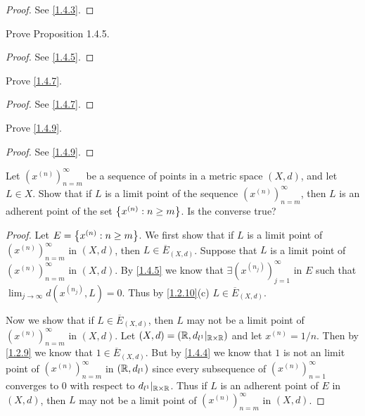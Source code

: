\begin{proof}
  See \cref{1.4.3}.
\end{proof}

\begin{ex}\label{ex:1.4.2}
  Prove Proposition 1.4.5.
\end{ex}

\begin{proof}
  See \cref{1.4.5}.
\end{proof}

\begin{ex}\label{ex:1.4.3}
  Prove \cref{1.4.7}.
\end{ex}

\begin{proof}
  See \cref{1.4.7}.
\end{proof}

\begin{ex}\label{ex:1.4.4}
  Prove \cref{1.4.9}.
\end{ex}

\begin{proof}
  See \cref{1.4.9}.
\end{proof}

\begin{ex}\label{ex:1.4.5}
  Let \((x^{(n)})_{n = m}^\infty\) be a sequence of points in a metric space \((X, d)\), and let \(L \in X\).
  Show that if \(L\) is a limit point of the sequence \((x^{(n)})_{n = m}^\infty\), then \(L\) is an adherent point of the set \(\left\lbrace x^{(n)} : n \geq m\right\rbrace\).
  Is the converse true?
\end{ex}

\begin{proof}
  Let \(E = \left\lbrace x^{(n)} : n \geq m\right\rbrace\).
  We first show that if \(L\) is a limit point of \((x^{(n)})_{n = m}^\infty\) in \((X, d)\), then \(L \in \overline{E}_{(X, d)}\).
  Suppose that \(L\) is a limit point of \((x^{(n)})_{n = m}^\infty\) in \((X, d)\).
  By \cref{1.4.5} we know that \(\exists (x^{(n_j)})_{j = 1}^\infty\) in \(E\) such that \(\lim_{j \to \infty} d(x^{(n_j)}, L) = 0\).
  Thus by \cref{1.2.10}(c) \(L \in \overline{E}_{(X, d)}\).

  Now we show that if \(L \in \overline{E}_{(X, d)}\), then \(L\) may not be a limit point of \((x^{(n)})_{n = m}^\infty\) in \((X, d)\).
  Let \((X, d) = (\mathbb{R}, d_{l^1}|_{\mathbb{R} \times \mathbb{R}})\) and let \(x^{(n)} = 1 / n\).
  Then by \cref{1.2.9} we know that \(1 \in \overline{E}_{(X, d)}\).
  But by \cref{1.4.4} we know that \(1\) is not an limit point of \((x^{(n)})_{n = m}^\infty\) in \((\mathbb{R}, d_{l^1})\) since every subsequence of \((x^{(n)})_{n = 1}^\infty\) converges to \(0\) with respect to \(d_{l^1}|_{\mathbb{R} \times \mathbb{R}}\).
  Thus if \(L\) is an adherent point of \(E\) in \((X, d)\), then \(L\) may not be a limit point of \((x^{(n)})_{n = m}^\infty\) in \((X, d)\).
\end{proof}

